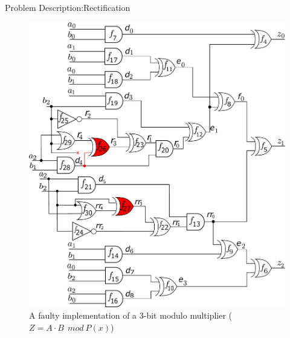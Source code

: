 \begin{frame}{\large Problem Description:Rectification}

\begin{figure}[hbt]
\centering
\includegraphics[scale=0.26]{mas_3_ddc_mfr_a.pdf}
\caption*{A faulty implementation of a 3-bit modulo multiplier ($Z = A \cdot B~~mod~P(x)$)
}\label{fig:mas_bug_Wa}
\end{figure}
\end{frame}


